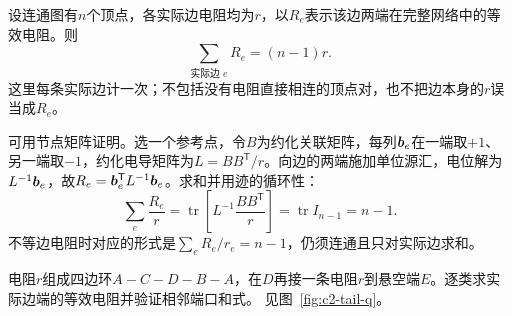 设连通图有$n$个顶点，各实际边电阻均为$r$，以$R_e$表示该边两端在完整网络中的等效电阻。则
\[
 \boxed{\sum_{\text{实际边 }e}R_e=(n-1)r}.
\]
这里每条实际边计一次；不包括没有电阻直接相连的顶点对，也不把边本身的$r$误当成$R_e$。

可用节点矩阵证明。选一个参考点，令$B$为约化关联矩阵，每列$\bm{b}_e$在一端取$+1$、另一端取$-1$，约化电导矩阵为$L=BB^{\mathsf T}/r$。向边的两端施加单位源汇，电位解为$L^{-1}\bm{b}_e$，故$R_e=\bm{b}_e^{\mathsf T}L^{-1}\bm{b}_e$。求和并用迹的循环性：
\[
 \sum_e\frac{R_e}r
 =\operatorname{tr}\!\left[L^{-1}\frac{BB^{\mathsf T}}r\right]
 =\operatorname{tr}I_{n-1}=n-1.
\]
不等边电阻时对应的形式是$\sum_e R_e/r_e=n-1$，仍须连通且只对实际边求和。

\begin{example}[四边形加悬边]\label{ex:c2-tail}
电阻$r$组成四边环$A-C-D-B-A$，在$D$再接一条电阻$r$到悬空端$E$。逐类求实际边端的等效电阻并验证相邻端口和式。 见图~\ref{fig:c2-tail-q}。
\end{example}

